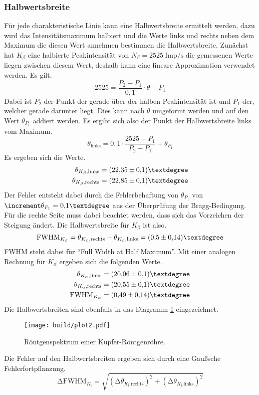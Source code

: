 \subsubsection{Halbwertsbreite}
Für jede charakteristische Linie kann eine Halbwertsbreite ermittelt werden, dazu wird das Intensitätsmaximum halbiert und die Werte links und rechts neben dem Maximum die diesen Wert
annehmen bestimmen die Halbwertsbreite.
Zunächst hat $K_{\beta}$ eine halbierte Peakintensität von $N_{\beta} = \SI{2525}{{\text{Imp}}\per\second}$ die gemessenen Werte liegen zwischen diesem Wert, deshalb kann eine
lineare Approximation verwendet werden. Es gilt.
\begin{equation*}
2525 = \frac{P_{2}-P_{1}}{0{,}1} \cdot \theta + P_{1}
\end{equation*}
Dabei ist $P_{2}$ der Punkt der gerade über der halben Peakintensität ist und $P_{1}$ der, welcher gerade darunter liegt.
Dies kann nach $\theta$ umgeformt werden und auf den Wert $\theta_{P_{1}}$ addiert werden. Es ergibt sich also der Punkt der Halbwertsbreite links vom Maximum.
\begin{equation*}
\theta_{\text{links}} = 0{,}1 \cdot \frac{2525-P_{1}}{P_{2}-P_{1}} + \theta_{P_{1}}
\end{equation*}
Es ergeben sich die Werte.
\begin{align*}
\theta_{K_{\beta}\text{,links}} &= (22{,}35 \pm 0{,}1)\textdegree\\
\theta_{K_{\beta}\text{,rechts}} &= (22{,}85\pm 0{,}1)\textdegree
\end{align*}
Der Fehler entsteht dabei durch die Fehlerbehaftung von $\theta_{P_{1}}$ von $\increment \theta_{P_{1}} = 0{,}1\textdegree$ aus der Überprüfung der Bragg-Bedingung.
Für die rechte Seite muss dabei beachtet werden, dass sich das Vorzeichen der Steigung ändert.
Die Halbwertsbreite für $K_{\beta}$ ist also.
\begin{equation*}
\text{FWHM}_{K_{\beta}} = \theta_{K_{\beta}\text{,rechts}} - \theta_{K_{\beta}\text{,links}} = (0{,}5 \pm 0{,}14)\textdegree
\end{equation*}
FWHM steht dabei für \enquote{Full Width at Half Maximum}.
Mit einer analogen Rechnung für $K_{\alpha}$ ergeben sich die folgenden Werte.
\begin{align*}
\theta_{K_{\alpha}\text{,links}} &= (20{,}06\pm 0{,}1)\textdegree \\
\theta_{K_{\alpha}\text{,rechts}} &= (20{,}55\pm 0{,}1)\textdegree \\
\text{FWHM}_{K_{\alpha}} &=  (0{,}49 \pm 0{,}14)\textdegree
\end{align*}
Die Halbwertsbreiten sind ebenfalls in das Diagramm \ref{fig:plot2} eingezeichnet.
\begin{figure}[h]
  \centering
  \texttt{[image: build/plot2.pdf]}
  \caption{Röntgenspektrum einer Kupfer-Röntgenröhre.}
  \label{fig:plot2}
\end{figure}
Die Fehler auf den Halbwertsbreiten ergeben sich durch eine Gaußsche Fehlerfortpflanzung.
\begin{equation*}
\increment \text{FWHM}_{K_{\text{i}}} = \sqrt{(\increment \theta_{K_{\text{i}}\text{,rechts}})^{2} + (\increment \theta_{K_{\text{i}}\text{,links}})^{2}}
\end{equation*}
